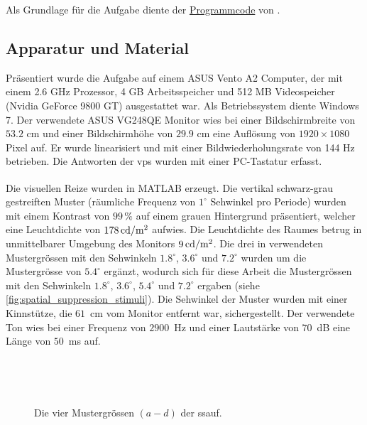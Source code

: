 \documentclass[11pt, twoside, a4paper]{book}		%
\begin{document}
Als Grundlage für die Aufgabe diente der \href{http://www.bcs.rochester.edu/people/duje/SuppressionCode.zip}{Programmcode} von \citet{Melnick2013}.

\subsection{Apparatur und Material \label{sub:ssas}}
Präsentiert wurde die Aufgabe auf einem ASUS Vento A2 Computer, der mit einem 2.6 GHz Prozessor, 4 GB Arbeitsspeicher und 512 MB Videospeicher (Nvidia GeForce 9800 GT) ausgestattet war. Als Betriebssystem diente Windows 7. Der verwendete ASUS VG248QE Monitor wies bei einer Bildschirmbreite von $53.2$ cm und einer Bildschirmhöhe von $29.9$ cm eine Auflösung von $1920 \times 1080$ Pixel auf. Er wurde linearisiert und mit einer Bildwiederholungsrate von 144 Hz betrieben. Die Antworten der \glspl{vp} wurden mit einer PC-Tastatur erfasst. 

Die visuellen Reize wurden in MATLAB\textsuperscript{\textregistered} \citep{matlab} erzeugt. Die vertikal schwarz-grau gestreiften Muster (räumliche Frequenz von $1^{\circ}$ Sehwinkel pro Periode) wurden mit einem Kontrast von $99\,\%$ auf einem grauen Hintergrund präsentiert, welcher eine Leuchtdichte von $178\,\textnormal{cd}/ \textnormal{m}^2$ aufwies. Die Leuchtdichte des Raumes betrug in unmittelbarer Umgebung des Monitors $9\,\textnormal{cd}/ \textnormal{m}^2$. Die drei in \citet{Melnick2013} verwendeten Mustergrössen mit den Sehwinkeln  $1.8^{\circ}$, $3.6^{\circ}$ und $7.2^{\circ}$ wurden um die Mustergrösse von $5.4^{\circ}$ ergänzt, wodurch sich für diese Arbeit die Mustergrössen mit den Sehwinkeln $1.8^{\circ}$, $3.6^{\circ}$, $5.4^{\circ}$ und $7.2^{\circ}$ ergaben (siehe \autoref{fig:spatial_suppression_stimuli}). 
Die Sehwinkel der Muster wurden mit einer Kinnstütze, die $61$~cm vom Monitor entfernt war, sichergestellt. 
Der verwendete Ton wies bei einer Frequenz von $2900$~Hz und einer Lautstärke von $70$~dB eine Länge von $50$~ms auf.

\begin{figure}[htb]
	\centering
	~~

	~~

	\caption[Die Spatial-Suppression-Bedingungen]{Die vier Mustergrössen $(a - d)$ der \gls{ssauf}.}
	\label{fig:spatial_suppression_stimuli}
\end{figure}
\end{document}
